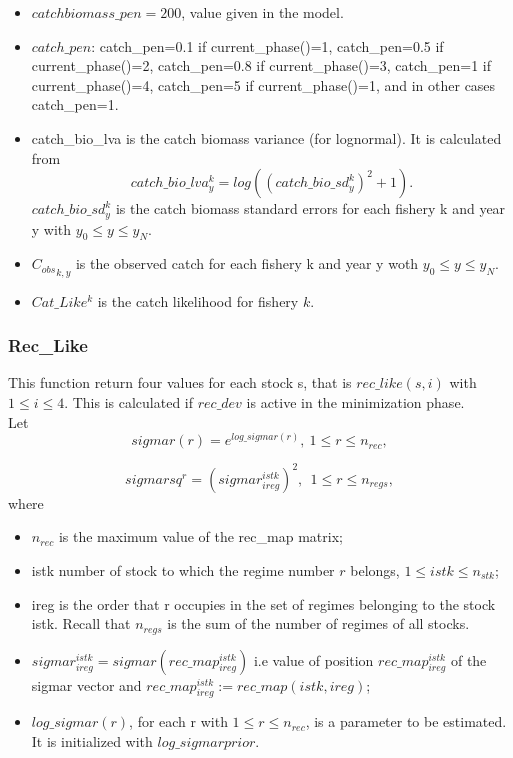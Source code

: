 \documentclass{article}
\begin{document}
    \begin{itemize}
        \item $catchbiomass\_pen=200$, value given in the model.
        \item $catch\_pen$: catch\_pen=0.1 if current\_phase()=1, catch\_pen=0.5 if current\_phase()=2, catch\_pen=0.8 if current\_phase()=3, catch\_pen=1 if current\_phase()=4, catch\_pen=5 if current\_phase()=1, and in other cases catch\_pen=1.
        \item catch\_bio\_lva is the catch biomass variance (for lognormal). It is calculated from 
        \begin{equation*}
            catch\_bio\_lva^k_y=log((catch\_bio\_sd^k_y)^2+1).
        \end{equation*}
        $catch\_bio\_sd^k_y$ is the catch biomass standard errors for each fishery k and year y with $y_0\leq y \leq y_N$.
        \item ${C_{obs}}_{k,y}$ is the observed catch for each fishery k and year y woth $y_0 \leq y \leq y_N$.
        \item $Cat\_Like^k$ is the catch likelihood for fishery $k$.
    \end{itemize}


\subsubsection{Rec\_Like}
This function return four values for each stock s, that is $rec\_like(s,i)$ with $1\leq i \leq 4$.
This is calculated if $rec\_dev$ is active in the minimization phase.\\
Let
\begin{equation}
    sigmar(r)=e^{log\_sigmar(r)}, \ 1\leq r \leq n_{rec},
\end{equation}

\begin{equation}
    sigmarsq^r=(sigmar^{istk}_{ireg})^2, \ \ 1\leq r \leq n_{regs},
\end{equation}
where
\begin{itemize}
    \item $n_{rec}$ is the maximum value of the rec\_map matrix;
    \item istk number of stock to which the regime number $r$ belongs, $1\leq istk \leq n_{stk}$;
    \item ireg is the order that r occupies in the
set of regimes belonging to the stock istk. Recall that $n_{regs}$ is the sum of the number of regimes of all
stocks. 
    \item $sigmar^{istk}_{ireg}=sigmar(rec\_map^{istk}_{ireg})$ i.e value of position $rec\_map^{istk}_{ireg}$ of the sigmar vector and $rec\_map^{istk}_{ireg}:=rec\_map(istk,ireg)$; 
    \item $log\_sigmar(r)$, for each r with $1\leq r\leq n_{rec}$, is a parameter to be estimated. It is initialized with $log\_sigmarprior$.
\end{itemize}
\end{document}

